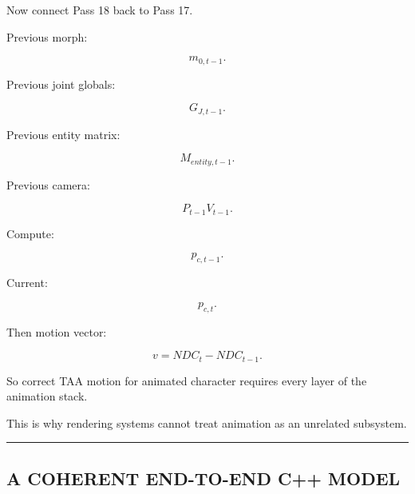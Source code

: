 Now connect Pass 18 back to Pass 17.

Previous morph:

\[
m_{0,t-1}.
\]

Previous joint globals:

\[
G_{J,t-1}.
\]

Previous entity matrix:

\[
M_{entity,t-1}.
\]

Previous camera:

\[
P_{t-1}V_{t-1}.
\]

Compute:

\[
p_{c,t-1}.
\]

Current:

\[
p_{c,t}.
\]

Then motion vector:

\[
v=
NDC_t-NDC_{t-1}.
\]

So correct TAA motion for animated character requires every layer of the animation stack.

This is why rendering systems cannot treat animation as an unrelated subsystem.

\begin{center}\rule{0.5\linewidth}{0.5pt}\end{center}

\subsection{A COHERENT END-TO-END C++ MODEL}\label{04-visual-computing-ii-ch041-a-coherent-end-to-end-c-model}


